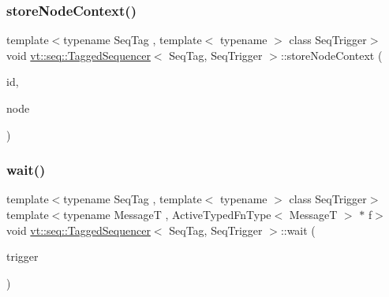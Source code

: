 \mbox{\label{structvt_1_1seq_1_1_tagged_sequencer_a580a0fd2ced16f447351f142f1438e42}} 
\subsubsection{\texorpdfstring{store\+Node\+Context()}{storeNodeContext()}}
{\footnotesize\ttfamily template$<$typename Seq\+Tag , template$<$ typename $>$ class Seq\+Trigger$>$ \\
void \hyperlink{structvt_1_1seq_1_1_tagged_sequencer}{vt\+::seq\+::\+Tagged\+Sequencer}$<$ Seq\+Tag, Seq\+Trigger $>$\+::store\+Node\+Context (\begin{DoxyParamCaption}\item[{\hyperlink{structvt_1_1seq_1_1_tagged_sequencer_a1c8ee839258d0f88c49ef660267a81d5}{Seq\+Type} const \&}]{id,  }\item[{\hyperlink{namespacevt_1_1seq_ae6a4874b585be0612aaca32ca6d2d191}{Seq\+Node\+Ptr\+Type}}]{node }\end{DoxyParamCaption})}

\mbox{\label{structvt_1_1seq_1_1_tagged_sequencer_a9a1be66a0b4667009824bbfbf9a5f7d1}} 
\subsubsection{\texorpdfstring{wait()}{wait()}\hspace{0.1cm}{\footnotesize\ttfamily [1/2]}}
{\footnotesize\ttfamily template$<$typename Seq\+Tag , template$<$ typename $>$ class Seq\+Trigger$>$ \\
template$<$typename MessageT , Active\+Typed\+Fn\+Type$<$ Message\+T $>$ $\ast$ f$>$ \\
void \hyperlink{structvt_1_1seq_1_1_tagged_sequencer}{vt\+::seq\+::\+Tagged\+Sequencer}$<$ Seq\+Tag, Seq\+Trigger $>$\+::wait (\begin{DoxyParamCaption}\item[{\hyperlink{structvt_1_1seq_1_1_tagged_sequencer_a4b015f2f7d3197a66af5576f0e63a834}{Seq\+Trigger\+Type}$<$ MessageT $>$}]{trigger }\end{DoxyParamCaption})}

